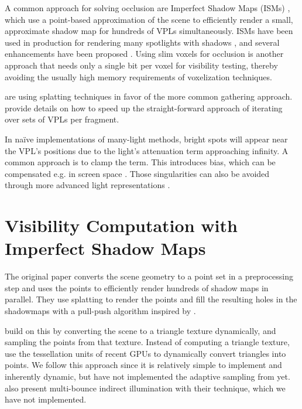 A common approach for solving occlusion are Imperfect Sha\-dow Maps (ISMs) \cite{ritschel2008ism}, which use a point-based approximation of the scene to efficiently render a small, approximate shadow map for hundreds of VPLs simultaneously. ISMs have been used in production for rendering many spotlights with shadows \cite{evans2015dreams}, and several enhancements have been proposed \cite{ritschel2011ismsViewAdaptive, hollander2011manylods, barak2013temporally}. Using slim voxels \cite{sugihara2014layered, sun2015manylightsSVO, chen2016quantizing} for occlusion is another approach that needs only a single bit per voxel for visibility testing, thereby avoiding the usually high memory requirements of voxelization techniques.

\cite{dachsbacher2006splatting, Nichols:2009:splatting} are using splatting techniques in favor of the more common gathering approach. \cite{sloan2007image, laine2007incremental} provide details on how to speed up the straight-forward approach of iterating over sets of VPLs per fragment.

In na\"ive implementations of many-light methods, bright spots will appear near the VPL's positions due to the light's attenuation term approaching infinity. A common approach is to clamp the term. This introduces bias, which can be compensated e.g. in screen space \cite{novak2011screen}. Those singularities can also be avoided through more advanced light representations \cite{tokuyoshi2015vsgl}. \cite{olsson2012clustered}



\section{Visibility Computation with Imperfect Shadow Maps}
\label{sec:concept:ism}

The original paper \cite{ritschel2008ism} converts the scene geometry to a point set in a preprocessing step and uses the points to efficiently render hundreds of shadow maps in parallel. They use splatting to render the points and fill the resulting holes in the shadowmaps with a pull-push algorithm inspired by \cite{Marroquim:2007:reconstruction}.

\cite{ritschel2011ismsViewAdaptive} build on this by converting the scene to a triangle texture dynamically, and sampling the points from that texture. Instead of computing a triangle texture, \cite{barak2013temporally} use the tessellation units of recent GPUs to dynamically convert triangles into points.
We follow this approach since it is relatively simple to implement and inherently dynamic, but have not implemented the adaptive sampling from \cite{ritschel2011ismsViewAdaptive} yet.
\cite{ritschel2008ism} also present multi-bounce indirect illumination with their technique, which we have not implemented.

